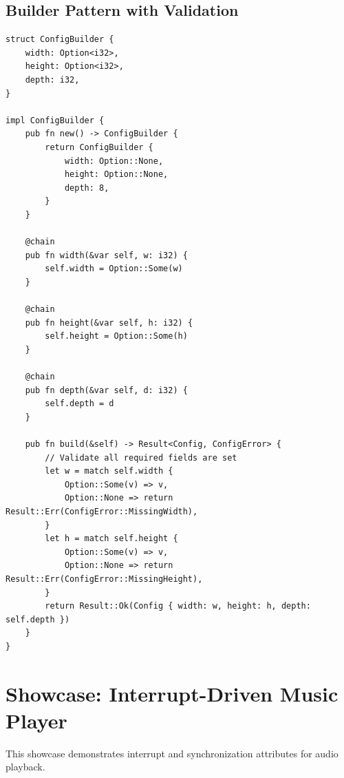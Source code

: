 \subsection{Builder Pattern with Validation}

\begin{lstlisting}
struct ConfigBuilder {
    width: Option<i32>,
    height: Option<i32>,
    depth: i32,
}

impl ConfigBuilder {
    pub fn new() -> ConfigBuilder {
        return ConfigBuilder {
            width: Option::None,
            height: Option::None,
            depth: 8,
        }
    }

    @chain
    pub fn width(&var self, w: i32) {
        self.width = Option::Some(w)
    }

    @chain
    pub fn height(&var self, h: i32) {
        self.height = Option::Some(h)
    }

    @chain
    pub fn depth(&var self, d: i32) {
        self.depth = d
    }

    pub fn build(&self) -> Result<Config, ConfigError> {
        // Validate all required fields are set
        let w = match self.width {
            Option::Some(v) => v,
            Option::None => return Result::Err(ConfigError::MissingWidth),
        }
        let h = match self.height {
            Option::Some(v) => v,
            Option::None => return Result::Err(ConfigError::MissingHeight),
        }
        return Result::Ok(Config { width: w, height: h, depth: self.depth })
    }
}
\end{lstlisting}

\section{Showcase: Interrupt-Driven Music Player}
\label{sec:showcase-music-player}

This showcase demonstrates interrupt and synchronization attributes for audio playback.

